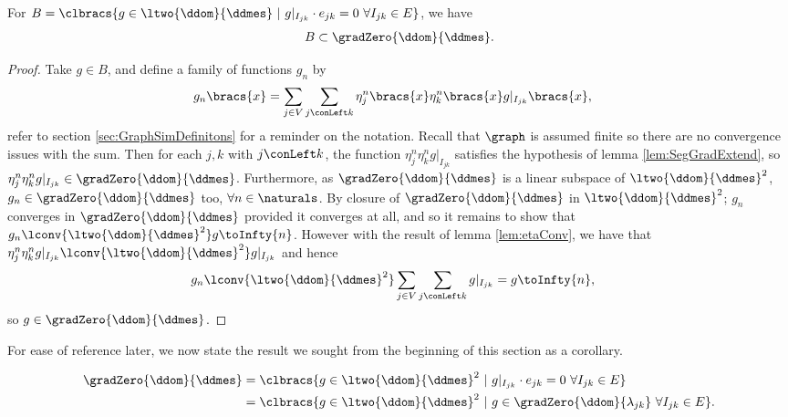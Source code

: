 \begin{prop} \label{prop:BIncGrad0}
	For $B = \clbracs{g\in\ltwo{\ddom}{\ddmes} \ \vert \ g\vert_{I_{jk}}\cdot e_{jk}=0 \ \forall I_{jk}\in E}$, we have
	\begin{align*}
		B \subset \gradZero{\ddom}{\ddmes}.
	\end{align*}
\end{prop}
\begin{proof}
	Take $g\in B$, and define a family of functions $g_n$ by
	\begin{align*}
		g_n\bracs{x} &= \sum_{j\in V}\sum_{j\conLeft k}\eta_j^n\bracs{x}\eta_k^n\bracs{x}g\vert_{I_{jk}}\bracs{x},
	\end{align*}
	refer to section \ref{sec:GraphSimDefinitons} for a reminder on the notation.
	Recall that $\graph$ is assumed finite so there are no convergence issues with the sum.
	Then for each $j,k$ with $j\conLeft k$, the function $\eta_j^n\eta_k^n g\vert_{I_{jk}}$ satisfies the hypothesis of lemma \ref{lem:SegGradExtend}, so $\eta_j^n\eta_k^n g\vert_{I_{jk}}\in\gradZero{\ddom}{\ddmes}$.
	Furthermore, as $\gradZero{\ddom}{\ddmes}$ is a linear subspace of $\ltwo{\ddom}{\ddmes}^{2}$, $g_n\in\gradZero{\ddom}{\ddmes}$ too, $\forall n\in\naturals$.
	By closure of $\gradZero{\ddom}{\ddmes}$ in $\ltwo{\ddom}{\ddmes}^2$; $g_n$ converges in $\gradZero{\ddom}{\ddmes}$ provided it converges at all, and so it remains to show that $g_n\lconv{\ltwo{\ddom}{\ddmes}^2} g \toInfty{n}$.
	However with the result of lemma \ref{lem:etaConv}, we have that $\eta_j^n\eta_k^n g\vert_{I_{jk}}\lconv{\ltwo{\ddom}{\ddmes}^2} g\vert_{I_{jk}}$ and hence
	\begin{align*}
		g_n \lconv{\ltwo{\ddom}{\ddmes}^2} &\sum_{j\in V}\sum_{j\conLeft k}g\vert_{I_{jk}} = g \toInfty{n},
	\end{align*}
	so $g\in\gradZero{\ddom}{\ddmes}$.
\end{proof}

For ease of reference later, we now state the result we sought from the beginning of this section as a corollary.
\begin{cory} \label{cory:CharacterisationGradientsZero}
	\begin{align*}
		\gradZero{\ddom}{\ddmes} &= \clbracs{g\in\ltwo{\ddom}{\ddmes}^2 \ \vert \ g\vert_{I_{jk}}\cdot e_{jk}=0 \ \forall I_{jk}\in E} \\
		&= \clbracs{g\in\ltwo{\ddom}{\ddmes}^2 \ \vert \ g\in\gradZero{\ddom}{\lambda_{jk}} \ \forall I_{jk}\in E}.
	\end{align*}
\end{cory}

